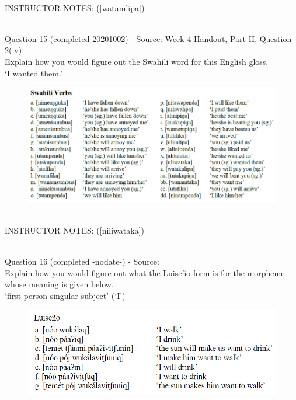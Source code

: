\documentclass[12pt]{article}
\begin{document}
~\\
INSTRUCTOR NOTES: ([watamlipa])


~\\

{\large Question 15} (completed 20201002) - Source: Week 4 Handout, Part II, Question 2(iv)\\

Explain how you would figure out the Swahili word for this English gloss.\\

‘I wanted them.’

\begin{figure}[H]
\includegraphics{../images/swahiliverbs.png}
\end{figure}

~\\
INSTRUCTOR NOTES: ([niliwataka])


~\\

{\large Question 16} (completed -nodate-) - Source: \\

Explain how you would figure out what the Luiseño form is for the morpheme whose meaning is given below.\\

‘first person singular subject’ (‘I’)

\begin{figure}[H]
\includegraphics{../images/luiseno.png}
\end{figure}
\end{document}
